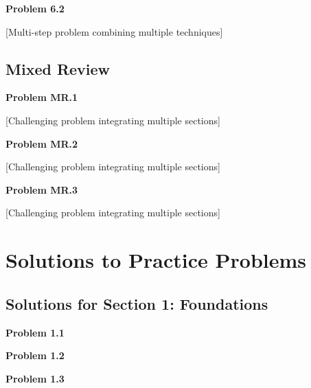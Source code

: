 \documentclass[12pt,letterpaper]{article}
\begin{document}
\vspace{12pt}

\textbf{Problem 6.2}

[Multi-step problem combining multiple techniques]

\vspace{12pt}


\subsection{Mixed Review}

\textbf{Problem MR.1}

[Challenging problem integrating multiple sections]

\vspace{12pt}

\textbf{Problem MR.2}

[Challenging problem integrating multiple sections]

\vspace{12pt}

\textbf{Problem MR.3}

[Challenging problem integrating multiple sections]


\newpage

\section{Solutions to Practice Problems}

\subsection{Solutions for Section 1: Foundations}

\textbf{Problem 1.1}

\begin{solution}
\end{solution}

\textbf{Problem 1.2}

\begin{solution}
\end{solution}

\textbf{Problem 1.3}
\end{document}
